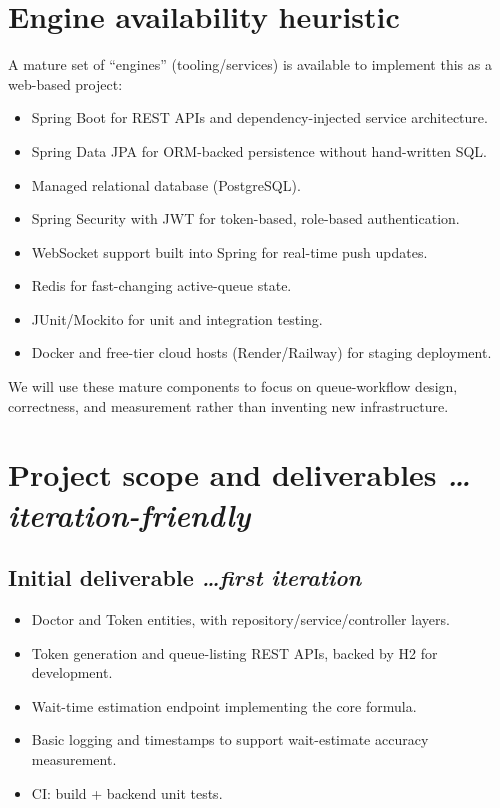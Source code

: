 \documentclass[11pt,a4paper]{article}
\newcommand{\BvrHint}[1]{%
  {\normalfont\normalsize\itshape\hfill #1}}
\begin{document}
\section{Engine availability heuristic}
A mature set of ``engines'' (tooling/services) is available to implement this as a web-based project:
\begin{itemize}[leftmargin=0.7cm]
    \item Spring Boot for REST APIs and dependency-injected service architecture.
    \item Spring Data JPA for ORM-backed persistence without hand-written SQL.
    \item Managed relational database (PostgreSQL).
    \item Spring Security with JWT for token-based, role-based authentication.
    \item WebSocket support built into Spring for real-time push updates.
    \item Redis for fast-changing active-queue state.
    \item JUnit/Mockito for unit and integration testing.
    \item Docker and free-tier cloud hosts (Render/Railway) for staging deployment.
\end{itemize}
We will use these mature components to focus on queue-workflow design, correctness, and measurement rather than inventing new infrastructure.

\section{Project scope and deliverables %
\BvrHint{\ldots iteration-friendly}}
\subsection{Initial deliverable %
\BvrHint{\ldots first iteration}}
\begin{itemize}[leftmargin=0.7cm]
    \item Doctor and Token entities, with repository/service/controller layers.
    \item Token generation and queue-listing REST APIs, backed by H2 for development.
    \item Wait-time estimation endpoint implementing the core formula.
    \item Basic logging and timestamps to support wait-estimate accuracy measurement.
    \item CI: build + backend unit tests.
\end{itemize}
\end{document}
